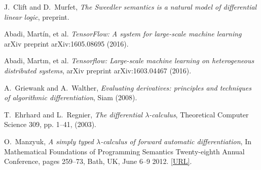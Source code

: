 \documentclass[english,letter paper,12pt,leqno]{article}
\theoremstyle{example}
\numberwithin{equation}{section}
\begin{document}
\begin{thebibliography}{BHLS03}
J.~Clift and D.~Murfet, \textsl{The Sweedler semantics is a natural model of differential linear logic}, preprint.

Abadi, Martín, et al. \textsl{TensorFlow: A system for large-scale machine learning} arXiv preprint arXiv:1605.08695 (2016).

Abadi, Martın, et al. \textsl{Tensorflow: Large-scale machine learning on heterogeneous distributed systems}, arXiv preprint arXiv:1603.04467 (2016).

A.~Griewank and A.~Walther, \textsl{Evaluating derivatives: principles and techniques of algorithmic differentiation}, Siam (2008).

T.~Ehrhard and L.~Regnier, \textsl{The differential $\lambda$-calculus}, Theoretical Computer Science 309, pp. 1--41, (2003).

O.~Manzyuk, \textsl{A simply typed $\lambda$-calculus of forward automatic differentiation}, In Mathematical Foundations of Programming Semantics Twenty-eighth Annual Conference, pages 259--73, Bath, UK, June 6–9 2012. \href{http://dauns.math.tulane.edu/~mfps/mfps28proc.pdf}{[URL]}.

\end{thebibliography}
\end{document}
